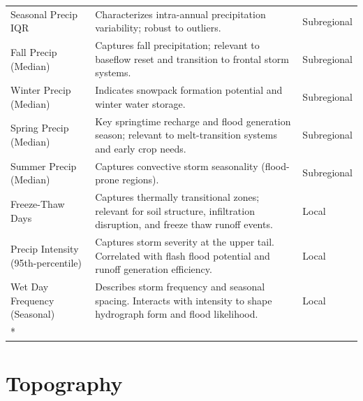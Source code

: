 \documentclass[
  10pt,
]{article}
\begin{document}
\begin{longtable}[t]{lp{8cm}l}
\addlinespace
Seasonal Precip IQR & Characterizes intra-annual precipitation variability; robust to
outliers. & Subregional\\
Fall Precip (Median) & Captures fall precipitation; relevant to baseflow reset and transition
to frontal storm systems. & Subregional\\
Winter Precip (Median) & Indicates snowpack formation potential and winter water storage. & Subregional\\
Spring Precip (Median) & Key springtime recharge and flood generation season; relevant to
melt-transition systems and early crop needs. & Subregional\\
Summer Precip (Median) & Captures convective storm seasonality (flood-prone regions). & Subregional\\
\addlinespace
Freeze-Thaw Days & Captures thermally transitional zones; relevant for soil structure,
infiltration disruption, and freeze thaw runoff events. & Local\\
Precip Intensity (95th-percentile) & Captures storm severity at the upper tail. Correlated with flash flood
potential and runoff generation efficiency. & Local\\
Wet Day Frequency (Seasonal) & Describes storm frequency and seasonal spacing. Interacts with
intensity to shape hydrograph form and flood likelihood. & Local\\*
\end{longtable}
\endgroup{}

\clearpage

\section*{ Topography }

\begingroup\fontsize{8}{10}\selectfont
\end{document}

